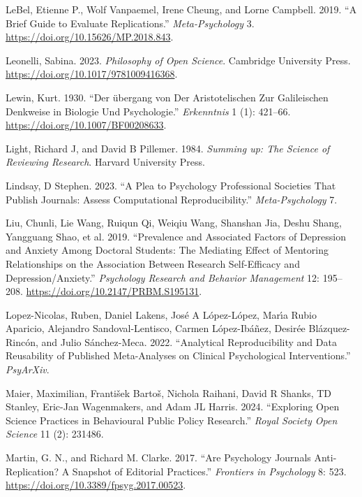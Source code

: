 \documentclass[
  letterpaper,
  DIV=11,
  numbers=noendperiod]{scrreprt}
\newlength{\cslhangindent}
\newenvironment{CSLReferences}[2] %
 {\begin{list}{}{%
  \setlength{\itemindent}{0pt}
  \setlength{\leftmargin}{0pt}
  \setlength{\parsep}{0pt}
  \ifodd #1
   \setlength{\leftmargin}{\cslhangindent}
   \setlength{\itemindent}{-1\cslhangindent}
  \fi
  \setlength{\itemsep}{#2\baselineskip}}}
 {\end{list}}
\begin{document}
\begin{CSLReferences}{1}{0}
LeBel, Etienne P., Wolf Vanpaemel, Irene Cheung, and Lorne Campbell.
2019. {``A Brief Guide to Evaluate Replications.''}
\emph{Meta-Psychology} 3. \url{https://doi.org/10.15626/MP.2018.843}.

Leonelli, Sabina. 2023. \emph{Philosophy of Open Science}. Cambridge
University Press. \url{https://doi.org/10.1017/9781009416368}.

Lewin, Kurt. 1930. {``Der {ü}bergang von Der Aristotelischen Zur
Galileischen Denkweise in Biologie Und Psychologie.''} \emph{Erkenntnis}
1 (1): 421--66. \url{https://doi.org/10.1007/BF00208633}.

Light, Richard J, and David B Pillemer. 1984. \emph{Summing up: The
Science of Reviewing Research}. Harvard University Press.

Lindsay, D Stephen. 2023. {``A Plea to Psychology Professional Societies
That Publish Journals: Assess Computational Reproducibility.''}
\emph{Meta-Psychology} 7.

Liu, Chunli, Lie Wang, Ruiqun Qi, Weiqiu Wang, Shanshan Jia, Deshu
Shang, Yangguang Shao, et al. 2019. {``Prevalence and Associated Factors
of Depression and Anxiety Among Doctoral Students: The Mediating Effect
of Mentoring Relationships on the Association Between Research
Self-Efficacy and Depression/Anxiety.''} \emph{Psychology Research and
Behavior Management} 12: 195--208.
\url{https://doi.org/10.2147/PRBM.S195131}.

Lopez-Nicolas, Ruben, Daniel Lakens, José A López-López, Marı́a Rubio
Aparicio, Alejandro Sandoval-Lentisco, Carmen López-Ibáñez, Desirée
Blázquez-Rincón, and Julio Sánchez-Meca. 2022. {``Analytical
Reproducibility and Data Reusability of Published Meta-Analyses on
Clinical Psychological Interventions.''} \emph{PsyArXiv}.

Maier, Maximilian, František Bartoš, Nichola Raihani, David R Shanks, TD
Stanley, Eric-Jan Wagenmakers, and Adam JL Harris. 2024. {``Exploring
Open Science Practices in Behavioural Public Policy Research.''}
\emph{Royal Society Open Science} 11 (2): 231486.

Martin, G. N., and Richard M. Clarke. 2017. {``Are Psychology Journals
Anti-Replication? A Snapshot of Editorial Practices.''} \emph{Frontiers
in Psychology} 8: 523. \url{https://doi.org/10.3389/fpsyg.2017.00523}.


\end{CSLReferences}
\end{document}

